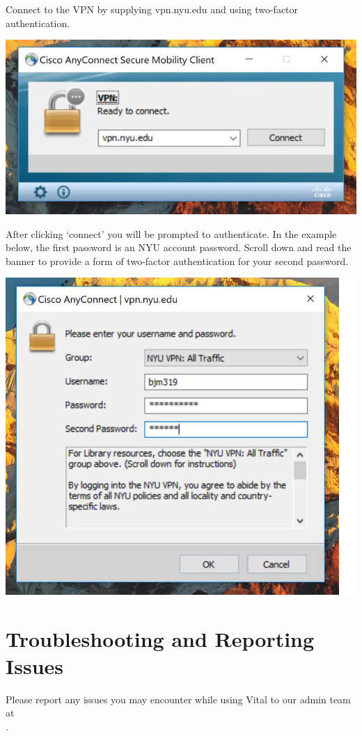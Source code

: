 \documentclass[12pt]{article}
\newcommand{\MYhref}[3][blue]{\href{#2}{\color{#1}{#3}}}%
\begin{document}
Connect to the VPN by supplying vpn.nyu.edu and using two-factor authentication.

{%
\centering
\includegraphics[scale=0.75]{vpn1.png}

}
After clicking `connect’ you will be prompted to authenticate. In the example below, the first password is an NYU account password. Scroll down and read the banner to provide a form of two-factor authentication for your second password.

{%
\centering
\includegraphics[scale=0.5]{vpn2.png}

}


\section*{Troubleshooting and Reporting Issues}
Please report any issues you may encounter while using Vital to our admin team at \\ \MYhref{mailto:vital@nyu.edu}{vital@nyu.edu}.

 
\end{document}
